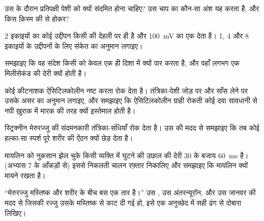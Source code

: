 \begin{exercise}[$\star\star$]\label{exo:g12:stretch-reflex:9}
उस  के दौरान प्रतिपक्षी पेशी को क्यों संदमित होना चाहिए? उस चाप का
कौन-सा अंश यह करता है, और किस क़िस्म की  से होकर?
\end{exercise}

\begin{exercise}[$\star\star$]\label{exo:g12:stretch-reflex:10}
2 इकाइयों का कोई उद्दीपन किसी  की देहली पर ही है और \qty{100}{mV} का
एक  देता है। 1, 4 और 8 इकाइयों के उद्दीपनों के लिए संकेत का
अनुमान लगाइए।
\end{exercise}

\begin{exercise}[$\star\star$]\label{exo:g12:stretch-reflex:11}
समझाइए कि वह संदेश किसी  को केवल एक ही दिशा में क्यों पार करता
है, और वहाँ लगभग एक मिलीसेकंड की देरी क्यों होती है।
\end{exercise}

\begin{exercise}[$\star\star\star$]\label{exo:g12:stretch-reflex:12}
कोई कीटनाशक ऐसिटिलकोलीन नष्ट करता  रोक देता है। तंत्रिका-पेशी जोड़ पर
और साँस लेने पर उसके असर का अनुमान लगाइए, और समझाइए कि ऐसिटिलकोलीन ग्राही
रोकती कोई दवा सावधानी से नपी ख़ुराक में मारक की तरह क्यों इस्तेमाल होती है।
\end{exercise}

\begin{exercise}[$\star\star\star$]\label{exo:g12:stretch-reflex:13}
स्ट्रिक्नीन मेरुरज्जु की संदमनकारी तंत्रिका-संधियाँ रोक देता है। उस
 की मदद से समझाइए कि तब कोई हल्का-सा स्पर्श पूरे शरीर की ऐंठन
क्यों छेड़ देता है।
\end{exercise}

\begin{exercise}[$\star\star\star$]\label{exo:g12:stretch-reflex:14}
मायलिन को नुक़सान झेल चुके किसी व्यक्ति में घुटने की उछाल की देरी 30 के बजाय
\qty{60}{ms} है। (अभ्यास 7 के आँकड़ों से) इससे निकलती चालन रफ़्तार निकालिए
और समझाइए कि मायलिन क्यों मायने रखता है।
\end{exercise}

\begin{exercise}[$\star\star\star$]\label{exo:g12:stretch-reflex:15}
``मेरुरज्जु मस्तिष्क और शरीर के बीच बस एक तार है।'' उस , उस
अंतरन्यूरॉन, और उस जानवर की मदद से जिसकी रज्जु उसके मस्तिष्क से काट दी गई
हो, इसे एक अनुच्छेद में सही ढंग से दोबारा लिखिए।
\end{exercise}

